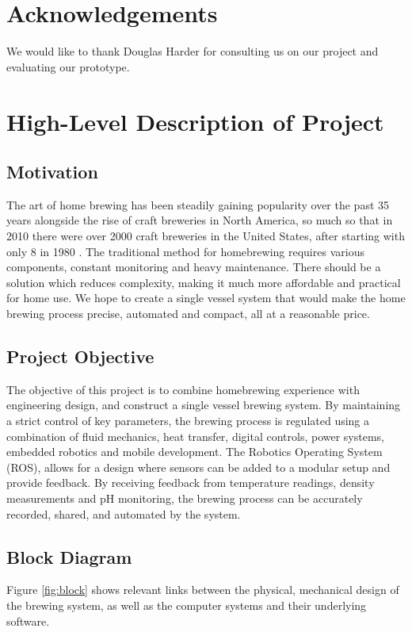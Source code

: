 \documentclass{article}
\begin{document}
\section*{Acknowledgements}
We would like to thank Douglas Harder for consulting us on our project and evaluating our prototype. 

\pagebreak

\glsunsetall
\tableofcontents
\pagebreak
\listoffigures
\listoftables
\glsresetall

\pagebreak

\setcounter{section}{0}
\section{High-Level Description of Project}
\subsection{Motivation}
The art of home brewing has been steadily gaining popularity over the past 35 years alongside the rise of craft breweries in North America, so much so that in 2010 there were over 2000 craft breweries in the United States, after starting with only 8 in 1980 \cite{craft-beer}. The traditional method for homebrewing requires various components, constant monitoring and heavy maintenance. There should be a solution which reduces complexity, making it much more affordable and practical for home use. We hope to create a single vessel system that would make the home brewing process precise, automated and compact, all at a reasonable price.
\subsection{Project Objective}
The objective of this project is to combine homebrewing experience with engineering design, and construct a single vessel brewing system. By maintaining a strict control of key parameters, the brewing process is regulated using a combination of fluid mechanics, heat transfer, digital controls, power systems, embedded robotics and mobile development. The Robotics Operating System (ROS), allows for a design where sensors can be added to a modular setup and provide feedback. By receiving feedback from temperature readings, density measurements and pH monitoring, the brewing process can be accurately recorded, shared, and automated by the system. 
\subsection{Block Diagram}
Figure \ref{fig:block} shows relevant links between the physical, mechanical design of the brewing system, as well as the computer systems and their underlying software.
\end{document}
